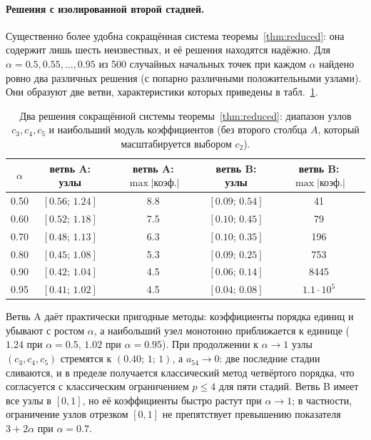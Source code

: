 \documentclass[11pt,a4paper]{article}
\theoremstyle{plain}
\theoremstyle{definition}
\begin{document}
\paragraph{Решения с изолированной второй стадией.} Существенно более удобна сокращённая система теоремы~\ref{thm:reduced}: она содержит лишь шесть неизвестных, и её решения находятся надёжно. Для $\alpha=0.5,0.55,\dots,0.95$ из 500 случайных начальных точек при каждом $\alpha$ найдено ровно два различных решения (с попарно различными положительными узлами). Они образуют две ветви, характеристики которых приведены в табл.~\ref{tab:branches}.

\begin{table}[ht]
\centering\small
\caption{Два решения сокращённой системы теоремы~\ref{thm:reduced}: диапазон узлов $c_3,c_4,c_5$ и наибольший модуль коэффициентов (без второго столбца $A$, который масштабируется выбором $c_2$).}\label{tab:branches}
\begin{tabular}{ccccc}
\toprule
$\alpha$ & ветвь A: узлы & ветвь A: $\max|\text{коэф.}|$ & ветвь B: узлы & ветвь B: $\max|\text{коэф.}|$\\
\midrule
0.50 & $[0.56;\,1.24]$ & 8.8 & $[0.09;\,0.54]$ & 41\\
0.60 & $[0.52;\,1.18]$ & 7.5 & $[0.10;\,0.45]$ & 79\\
0.70 & $[0.48;\,1.13]$ & 6.3 & $[0.10;\,0.35]$ & 196\\
0.80 & $[0.45;\,1.08]$ & 5.3 & $[0.09;\,0.25]$ & 753\\
0.90 & $[0.42;\,1.04]$ & 4.5 & $[0.06;\,0.14]$ & 8445\\
0.95 & $[0.41;\,1.02]$ & 4.5 & $[0.04;\,0.08]$ & $1.1\cdot10^{5}$\\
\bottomrule
\end{tabular}
\end{table}

Ветвь A даёт практически пригодные методы: коэффициенты порядка единиц и убывают с ростом $\alpha$, а наибольший узел монотонно приближается к единице ($1.24$ при $\alpha=0.5$, $1.02$ при $\alpha=0.95$). При продолжении к $\alpha\to1$ узлы $(c_3,c_4,c_5)$ стремятся к $(0.40;\,1;\,1)$, а $a_{54}\to0$: две последние стадии сливаются, и в пределе получается классический метод четвёртого порядка, что согласуется с классическим ограничением $p\le4$ для пяти стадий. Ветвь B имеет все узлы в $[0,1]$, но её коэффициенты быстро растут при $\alpha\to1$; в частности, ограничение узлов отрезком $[0,1]$ не препятствует превышению показателя $3+2\alpha$ при $\alpha=0.7$.
\end{document}
